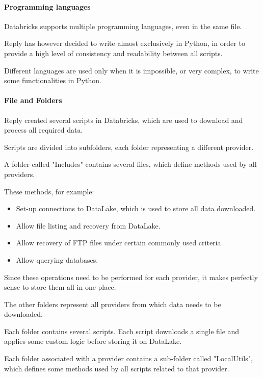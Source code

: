 \paragraph{Programming languages}
    Databricks supports multiple programming languages, even in the same file.
    
    Reply has however decided to write almost exclusively in Python, in order to provide a high level of consistency and readability between all scripts.
    
    Different languages are used only when it is impossible, or very complex, to write some functionalities in Python.

\paragraph{File and Folders}
    Reply created several scripts in Databricks, which are used to download and process all required data.

    Scripts are divided into subfolders, each folder representing a different provider.
    
        A folder called "Includes" contains several files, which define methods used by all providers.
    
        These methods, for example:
            \begin{itemize}
                \item Set-up connections to DataLake, which is used to store all data downloaded.
                \item Allow file listing and recovery from DataLake.
                \item Allow recovery of FTP files under certain commonly used criteria.
                \item Allow querying databases.
            \end{itemize}
            
        Since these operations need to be performed for each provider, it makes perfectly sense to store them all in one place.
    
        The other folders represent all providers from which data needs to be downloaded.
        
        Each folder contains several scripts.
        Each script downloads a single file and applies some custom logic before storing it on DataLake.
        
        Each folder associated with a provider contains a sub-folder called "LocalUtils", which defines some methods used by all scripts related to that provider.
        
